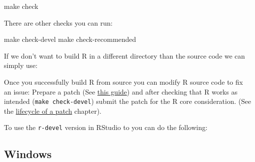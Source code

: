 \documentclass[
]{book}
\newenvironment{Shaded}{\begin{snugshade}}{\end{snugshade}}
\newcommand{\AttributeTok}[1]{\textcolor[rgb]{0.77,0.63,0.00}{#1}}
\newcommand{\BuiltInTok}[1]{#1}
\newcommand{\ExtensionTok}[1]{#1}
\newcommand{\FunctionTok}[1]{\textcolor[rgb]{0.00,0.00,0.00}{#1}}
\newcommand{\NormalTok}[1]{#1}
\newcommand{\OperatorTok}[1]{\textcolor[rgb]{0.81,0.36,0.00}{\textbf{#1}}}
\newcommand{\StringTok}[1]{\textcolor[rgb]{0.31,0.60,0.02}{#1}}
\newcommand{\VariableTok}[1]{\textcolor[rgb]{0.00,0.00,0.00}{#1}}
\begin{document}
\begin{enumerate}
\begin{Shaded}
\begin{Highlighting}[]
\FunctionTok{make}\NormalTok{ check}
\end{Highlighting}
\end{Shaded}

  There are other checks you can run:

\begin{Shaded}
\begin{Highlighting}[]
\FunctionTok{make}\NormalTok{ check{-}devel}
\FunctionTok{make}\NormalTok{ check{-}recommended}
\end{Highlighting}
\end{Shaded}
\end{enumerate}

If we don't want to build R in a different directory than the source code we can simply use:

\begin{Shaded}
\end{Shaded}

Once you successfully build R from source you can modify R source code to fix an issue: Prepare a patch (See \href{https://www.r-project.org/bugs.html\#how-to-submit-patches}{this guide}) and after checking that R works as intended (\texttt{make\ check-devel}) submit the patch for the R core consideration.
(See the \protect\hyperlink{FixBug}{lifecycle of a patch} chapter).

To use the \texttt{r-devel} version in RStudio to you can do the following:

\begin{Shaded}
\end{Shaded}

\hypertarget{windows}{%
\subsection{Windows}\label{windows}}
\end{document}
